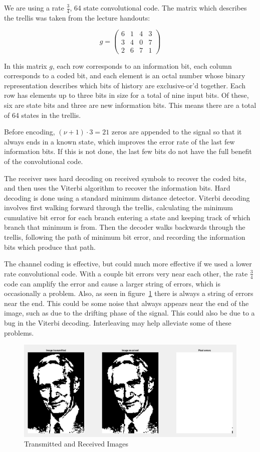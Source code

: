 \documentclass{article}
\begin{document}
We are using a rate $\frac{3}{4}$, 64 state convolutional code. The matrix
which describes the trellis was taken from the lecture handouts:

\[
  g =
  \begin{pmatrix}
    6 & 1 & 4 & 3 \\
    3 & 4 & 0 & 7 \\
    2 & 6 & 7 & 1
  \end{pmatrix}
\]

In this matrix $g$, each row corresponds to an information bit, each column
corresponds to a coded bit, and each element is an octal number whose binary
representation describes which bits of history are exclusive-or'd together. Each
row has elements up to three bits in size for a total of nine input bits. Of
these, six are state bits and three are new information bits. This means there
are a total of 64 states in the trellis.

Before encoding, $(\nu+1) \cdot 3 = 21$ zeros are appended to the signal so that
it always ends in a known state, which improves the error rate of the last few
information bits. If this is not done, the last few bits do not have the full
benefit of the convolutional code.

The receiver uses hard decoding on received symbols to recover the coded bits,
and then uses the Viterbi algorithm to recover the information bits. Hard
decoding is done using a standard minimum distance detector. Viterbi decoding
involves first walking forward through the trellis, calculating the minimum
cumulative bit error for each branch entering a state and keeping track of which
branch that minimum is from. Then the decoder walks backwards through the
trellis, following the path of minimum bit error, and recording the information
bits which produce that path.

The channel coding is effective, but could much more effective if we used a
lower rate convolutional code. With a couple bit errors very near each other,
the rate $\frac{3}{4}$ code can amplify the error and cause a larger string of
errors, which is occasionally a problem. Also, as seen in figure~\ref{fig:pics}
there is always a string of errors near the end. This could be some noise that
always appears near the end of the image, such as due to the drifting phase of
the signal. This could also be due to a bug in the Viterbi decoding.
Interleaving may help alleviate some of these problems.

\begin{figure}
  \centering\includegraphics[width=\textwidth]{../presentation/images.png}
  \caption{Transmitted and Received Images}
  \label{fig:pics}
\end{figure}
\end{document}
